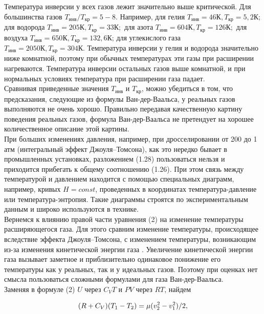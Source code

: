 Температура инверсии у всех газов лежит значительно выше критической. Для большинства газов $T_{инв}/T_{кр} = 5-8$. Например, для гелия $T_{инв} = 46К, T_{кр} = 5,2К$; для водорода $T_{инв} = 205К, T_{кр }= 33К;$ для азота $T_{инв} = 604 К, T_{кр} = 126 К;$ для воздуха $T_{инв} = 650 К, T_{кр} = 132,6 К$; для углекислого газа $T_{инв} = 2050 К, T_{кр} = 304 К.$ Температура инверсии у гелия и водорода значительно ниже комнатной, поэтому при обычных температурах эти газы при расширении нагреваются. Температура инверсии остальных газов выше комнатной, и при нормальных условиях температура при расширении газа падает.\\

Сравнивая приведенные значения $T_{инв}$ и $T_{кр}$, можно убедиться в том, что предсказания, следующие из формулы Ван-дер-Ваальса, у реальных газов выполняются не очень хорошо. Правильно передавая качественную картину поведения реальных газов, формула Ван-дер-Ваальса не претендует на хорошее количественное описание этой картины.\\

При больших изменениях давления, например, при дросселировании от 200 до 1 атм (интегральный эффект Джоуля–Томсона), как это нередко бывает в промышленных установках, разложением (1.28) пользоваться нельзя и приходится прибегать к общему соотношению (1.26). При этом связь между температурой и давлением находится с помощью специальных диаграмм, например, кривых $H = const$, проведенных в координатах температура-давление или температура-энтропия. Такие диаграммы строятся по экспериментальным данным и широко используются в технике.\\

Вернемся к влиянию правой части уравнения (2) на изменение температуры расширяющегося газа. Для этого сравним изменение температуры, происходящее вследствие эффекта Джоуля–Томсона, с
изменением температуры, возникающим из-за изменения кинетической энергии газа . Увеличение кинетической энергии газа вызывает заметное и приблизительно одинаковое понижение его температуры как у реальных, так и у идеальных газов. Поэтому при оценках нет смысла пользоваться сложными формулами для газа Ван-дер-Ваальса.\\

Заменяя в формуле (2) $U$ через $C_V T$ и $P V$ через $RT$, найдем

\begin{equation}
(R+C_V)(T_1 - T_2) = \mu(v_2^2 - v_1^2)/2,$$
\end{equation}

